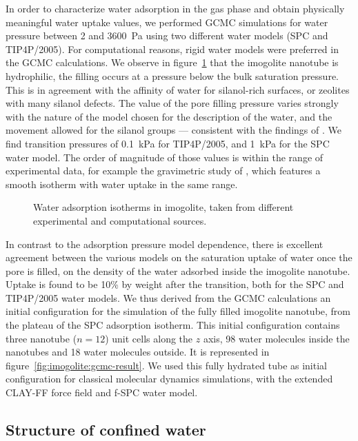 \documentclass[thesis]{subfiles}
\begin{document}
In order to characterize water adsorption in the gas phase and obtain physically
meaningful water uptake values, we performed GCMC simulations for water pressure
between 2 and \SI{3600}{Pa} using two different water models (SPC and
TIP4P/2005). For computational reasons, rigid water models were preferred in the
GCMC calculations. We observe in figure~\ref{fig:imogolite:isotherms} that the
imogolite nanotube is hydrophilic, \ie the filling occurs at a pressure below
the bulk saturation pressure. This is in agreement with the affinity of water
for silanol-rich surfaces, or zeolites with many silanol
defects\cite{Coudert2009}. The value of the pore filling pressure varies
strongly with the nature of the model chosen for the description of the water,
and the movement allowed for the silanol groups --- consistent with the findings
of \citeauthor{Zang2010}\cite{Zang2010}. We find transition pressures of
\SI{0.1}{kPa} for TIP4P/2005, and \SI{1}{kPa} for the SPC water model. The order
of magnitude of those values is within the range of experimental data, for
example the gravimetric study of \citeauthor{Konduri2008}\cite{Konduri2008},
which features a smooth isotherm with water uptake in the same range.

\begin{figure}[ht]
    \centering
    
    \caption{Water adsorption isotherms in imogolite, taken from different
    experimental and computational sources.}
    \label{fig:imogolite:isotherms}
\end{figure}

In contrast to the adsorption pressure model dependence, there is excellent
agreement between the various models on the saturation uptake of water once the
pore is filled, \ie on the density of the water adsorbed inside the imogolite
nanotube. Uptake is found to be 10\% by weight after the transition, both for
the SPC and TIP4P/2005 water models. We thus derived from the GCMC calculations
an initial configuration for the simulation of the fully filled imogolite
nanotube, from the plateau of the SPC adsorption isotherm. This initial
configuration contains three nanotube ($n=12$) unit cells along the $z$ axis, 98
water molecules inside the nanotubes and 18 water molecules outside. It is
represented in figure~\ref{fig:imogolite:gcmc-result}. We used this fully
hydrated tube as initial configuration for classical molecular dynamics
simulations, with the extended CLAY-FF force field and f-SPC water model.

\newpage
\subsection{Structure of confined water}
\end{document}
